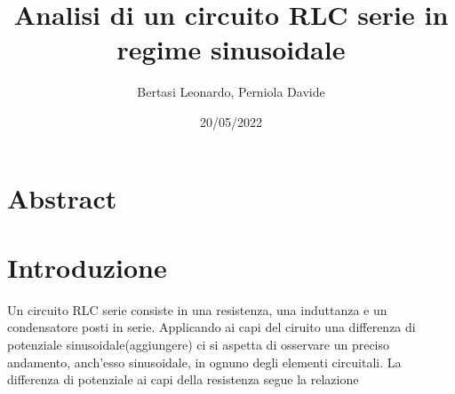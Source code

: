 \documentclass{article}
\title{Analisi di un circuito RLC serie in regime sinusoidale}
\date{20/05/2022}
\author{Bertasi Leonardo, Perniola Davide}
\begin{document}
\maketitle
\section{Abstract} 


\section{Introduzione} 
Un circuito RLC serie consiste in una resistenza, una induttanza e un condensatore posti in serie. Applicando ai capi del ciruito una differenza di potenziale sinusoidale(aggiungere) ci si aspetta di osservare un preciso andamento, anch'esso sinusoidale, in ognuno degli elementi circuitali. La differenza di potenziale ai capi della resistenza segue la relazione
$$
$$
\end{document}
